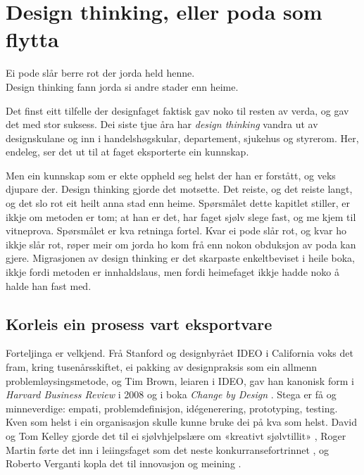 \chapter{Design thinking, eller poda som flytta}

\begin{motto}
Ei pode slår berre rot der jorda held henne.\\ Design thinking fann jorda si andre stader enn heime.
\end{motto}

Det finst eitt tilfelle der designfaget faktisk gav noko til resten av verda, og gav det med stor suksess. Dei siste tjue åra har \emph{design thinking} vandra ut av designskulane og inn i handelshøgskular, departement, sjukehus og styrerom. Her, endeleg, ser det ut til at faget eksporterte ein kunnskap.

Men ein kunnskap som er ekte oppheld seg helst der han er forstått, og veks djupare der. Design thinking gjorde det motsette. Det reiste, og det reiste langt, og det slo rot eit heilt anna stad enn heime. Spørsmålet dette kapitlet stiller, er ikkje om metoden er tom; at han er det, har faget sjølv slege fast, og me kjem til vitneprova. Spørsmålet er kva retninga fortel. Kvar ei pode slår rot, og kvar ho ikkje slår rot, røper meir om jorda ho kom frå enn nokon obduksjon av poda kan gjere. Migrasjonen av design thinking er det skarpaste enkeltbeviset i heile boka, ikkje fordi metoden er innhaldslaus, men fordi heimefaget ikkje hadde noko å halde han fast med.


\section{Korleis ein prosess vart eksportvare}

Forteljinga er velkjend. Frå Stanford og designbyrået IDEO i California voks det fram, kring tusenårsskiftet, ei pakking av designpraksis som ein allmenn problemløysingsmetode, og Tim Brown, leiaren i IDEO, gav han kanonisk form i \textit{Harvard Business Review} i 2008 \autocite{brown2008} og i boka \textit{Change by Design} \autocite{brown2009change}. Stega er få og minneverdige: empati, problemdefinisjon, idégenerering, prototyping, testing. Kven som helst i ein organisasjon skulle kunne bruke dei på kva som helst. David og Tom Kelley gjorde det til ei sjølvhjelpslære om «kreativt sjølvtillit» \autocite{kelley2013}, Roger Martin førte det inn i leiingsfaget som det neste konkurransefortrinnet \autocite{martin2009}, og Roberto Verganti kopla det til innovasjon og meining \autocite{verganti2009}.

